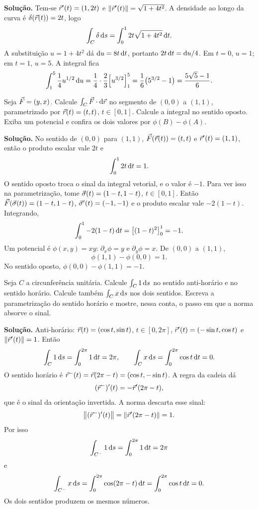 \documentclass[11pt,a4paper]{article}
\begin{document}
\noindent\textbf{Solução.}
Tem-se $\vec{r}'(t)=(1,2t)$ e $\left\lVert \vec{r}'(t) \right\rVert=\sqrt{1+4t^2}$. A densidade ao longo da curva é $\delta(\vec{r}(t))=2t$, logo
\[
\int_C\delta\,\mathrm{d} s=\int_0^1 2t\sqrt{1+4t^2}\,\mathrm{d} t.
\]
A substituição $u=1+4t^2$ dá $\mathrm{d} u=8t\,\mathrm{d} t$, portanto $2t\,\mathrm{d} t=\mathrm{d} u/4$. Em $t=0$, $u=1$; em $t=1$, $u=5$. A integral fica
\[
\int_1^5\frac14 u^{1/2}\,\mathrm{d} u
=\frac14\cdot\frac23\Bigl[u^{3/2}\Bigr]_1^5
=\frac16\bigl(5^{3/2}-1\bigr)
=\frac{5\sqrt{5}-1}{6}.
\]

\begin{exercicio}
Seja $\vec{F}=(y,x)$. Calcule $\int_C\vec{F}\cdot\mathrm{d}\vec{r}$ no segmento de $(0,0)$ a $(1,1)$, parametrizado por $\vec{r}(t)=(t,t)$, $t\in[0,1]$. Calcule a integral no sentido oposto. Exiba um potencial e confira os dois valores por $\phi(B)-\phi(A)$.
\end{exercicio}

\noindent\textbf{Solução.}
No sentido de $(0,0)$ para $(1,1)$, $\vec{F}(\vec{r}(t))=(t,t)$ e $\vec{r}'(t)=(1,1)$, então o produto escalar vale $2t$ e
\[
\int_0^1 2t\,\mathrm{d} t=1.
\]
O sentido oposto troca o sinal da integral vetorial, e o valor é $-1$. Para ver isso na parametrização, tome $\vec{\sigma}(t)=(1-t,1-t)$, $t\in[0,1]$. Então $\vec{F}(\vec{\sigma}(t))=(1-t,1-t)$, $\vec{\sigma}'(t)=(-1,-1)$ e o produto escalar vale $-2(1-t)$. Integrando,
\[
\int_0^1 -2(1-t)\,\mathrm{d} t=\bigl[(1-t)^2\bigr]_0^1=-1.
\]
Um potencial é $\phi(x,y)=xy$: $\partial_x\phi=y$ e $\partial_y\phi=x$. De $(0,0)$ a $(1,1)$,
\[
\phi(1,1)-\phi(0,0)=1.
\]
No sentido oposto, $\phi(0,0)-\phi(1,1)=-1$.

\begin{exercicio}
Seja $C$ a circunferência unitária. Calcule $\int_C 1\,\mathrm{d} s$ no sentido anti-horário e no sentido horário. Calcule também $\int_C x\,\mathrm{d} s$ nos dois sentidos. Escreva a parametrização do sentido horário e mostre, nessa conta, o passo em que a norma absorve o sinal.
\end{exercicio}

\noindent\textbf{Solução.}
Anti-horário: $\vec{r}(t)=(\cos t,\sin t)$, $t\in[0,2\pi]$, $\vec{r}'(t)=(-\sin t,\cos t)$ e $\left\lVert \vec{r}'(t) \right\rVert=1$. Então
\[
\int_C 1\,\mathrm{d} s=\int_0^{2\pi}1\,\mathrm{d} t=2\pi,
\qquad
\int_C x\,\mathrm{d} s=\int_0^{2\pi}\cos t\,\mathrm{d} t=0.
\]
O sentido horário é $\vec{r}^{-}(t)=\vec{r}(2\pi-t)=(\cos t,-\sin t)$. A regra da cadeia dá
\[
(\vec{r}^{-})'(t)=-\vec{r}'(2\pi-t),
\]
que é o sinal da orientação invertida. A norma descarta esse sinal:
\[
\left\lVert (\vec{r}^{-})'(t) \right\rVert=\left\lVert \vec{r}'(2\pi-t) \right\rVert=1.
\]
Por isso
\[
\int_{C^{-}}1\,\mathrm{d} s=\int_0^{2\pi}1\,\mathrm{d} t=2\pi
\]
e
\[
\int_{C^{-}}x\,\mathrm{d} s=\int_0^{2\pi}\cos(2\pi-t)\,\mathrm{d} t=\int_0^{2\pi}\cos t\,\mathrm{d} t=0.
\]
Os dois sentidos produzem os mesmos números.
\end{document}
